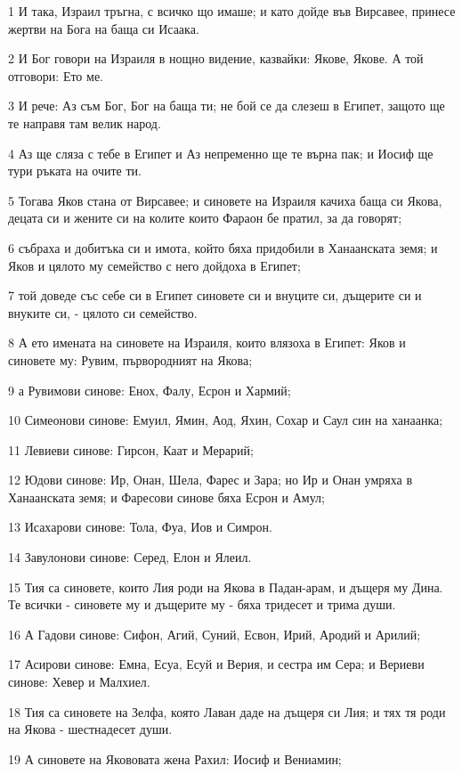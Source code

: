 \par 1 И така, Израил тръгна, с всичко що имаше; и като дойде във Вирсавее, принесе жертви на Бога на баща си Исаака.
\par 2 И Бог говори на Израиля в нощно видение, казвайки: Якове, Якове. А той отговори: Ето ме.
\par 3 И рече: Аз съм Бог, Бог на баща ти; не бой се да слезеш в Египет, защото ще те направя там велик народ.
\par 4 Аз ще сляза с тебе в Египет и Аз непременно ще те върна пак; и Иосиф ще тури ръката на очите ти.
\par 5 Тогава Яков стана от Вирсавее; и синовете на Израиля качиха баща си Якова, децата си и жените си на колите които Фараон бе пратил, за да говорят;
\par 6 събраха и добитъка си и имота, който бяха придобили в Ханаанската земя; и Яков и цялото му семейство с него дойдоха в Египет;
\par 7 той доведе със себе си в Египет синовете си и внуците си, дъщерите си и внуките си, - цялото си семейство.
\par 8 А ето имената на синовете на Израиля, които влязоха в Египет: Яков и синовете му: Рувим, първородният на Якова;
\par 9 а Рувимови синове: Енох, Фалу, Есрон и Хармий;
\par 10 Симеонови синове: Емуил, Ямин, Аод, Яхин, Сохар и Саул син на ханаанка;
\par 11 Левиеви синове: Гирсон, Каат и Мерарий;
\par 12 Юдови синове: Ир, Онан, Шела, Фарес и Зара; но Ир и Онан умряха в Ханаанската земя; и Фаресови синове бяха Есрон и Амул;
\par 13 Исахарови синове: Тола, Фуа, Иов и Симрон.
\par 14 Завулонови синове: Серед, Елон и Ялеил.
\par 15 Тия са синовете, които Лия роди на Якова в Падан-арам, и дъщеря му Дина. Те всички - синовете му и дъщерите му - бяха тридесет и трима души.
\par 16 А Гадови синове: Сифон, Агий, Суний, Есвон, Ирий, Ародий и Арилий;
\par 17 Асирови синове: Емна, Есуа, Есуй и Верия, и сестра им Сера; и Вериеви синове: Хевер и Малхиел.
\par 18 Тия са синовете на Зелфа, която Лаван даде на дъщеря си Лия; и тях тя роди на Якова - шестнадесет души.
\par 19 А синовете на Якововата жена Рахил: Иосиф и Вениамин;
